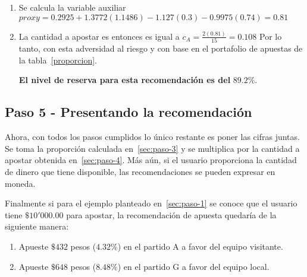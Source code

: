 \begin{enumerate}
\begin{enumerate}
		\item Se calcula la variable auxiliar $proxy = 0.2925 + 1.3772(1.1486) -1.127(0.3) - 0.9975(0.74) = 0.81$
		
		\item La cantidad a apostar es entonces es igual a $c_A = \frac{2(0.81)}{15} = 0.108$
		Por lo tanto, con esta adversidad al riesgo y con base en el portafolio de apuestas de la tabla~\ref{proporcion}.
		
		\textbf{El nivel de reserva para esta recomendación es del} $\mathbf{89.2\%}$.
	\end{enumerate}
\end{enumerate}

\subsection{Paso 5 - Presentando la recomendación}
\label{sec:paso-5}
Ahora, con todos los pasos cumplidos lo único restante es poner las cifras juntas. Se toma la proporción calculada en~\ref{sec:paso-3} y se multiplica por la cantidad a apostar obtenida en~\ref{sec:paso-4}.
Más aún, si el usuario proporciona la cantidad de dinero que tiene disponible, las recomendaciones se pueden expresar en moneda.

Finalmente si para el ejemplo planteado en~\ref{sec:paso-1} se conoce que el usuario tiene $\$10'000.00$ para apostar, la recomendación de apuesta quedaría de la siguiente manera:
\begin{enumerate}
	\item Apueste $\$432$ pesos ($4.32\%$) en el partido A a favor del equipo visitante.
	\item Apueste $\$648$ pesos ($8.48\%$) en el partido G a favor del equipo local.
\end{enumerate}


